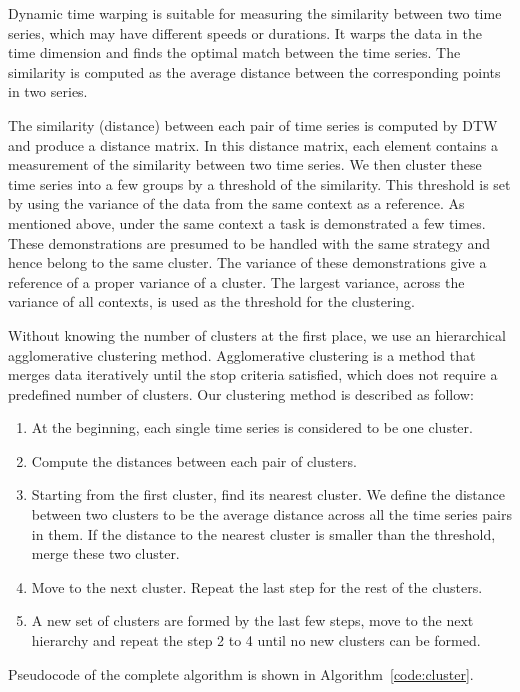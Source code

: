\documentclass[preprint,12pt]{elsarticle}
\begin{document}
Dynamic time warping is suitable for measuring the similarity between two time series, which may have different speeds or durations. It warps the data in the time dimension and finds the optimal match between the time series. The similarity is computed as the average distance between the corresponding points in two series.

The similarity (distance) between each pair of time series is computed by DTW and produce a distance matrix. In this distance matrix, each element contains a measurement of the similarity between two time series. We then cluster these time series into a few groups by a threshold of the similarity. This threshold is set by using the variance of the data from the same context as a reference. As mentioned above, under the same context a task is demonstrated a few times. These demonstrations are presumed to be handled with the same strategy and hence belong to the same cluster. The variance of these demonstrations give a reference of a proper variance of a cluster. The largest variance, across the variance of all contexts, is used as the threshold for the clustering.

Without knowing the number of clusters at the first place, we use an hierarchical agglomerative clustering method. Agglomerative clustering is a method that merges data iteratively until the stop criteria satisfied, which does not require a predefined number of clusters. Our clustering method is described as follow:

\begin{enumerate}
\item At the beginning, each single time series is considered to be one cluster.
\item Compute the distances between each pair of clusters.
\item Starting from the first cluster, find its nearest cluster. We define the distance between two clusters to be the average distance across all the time series pairs in them. If the distance to the nearest cluster is smaller than the threshold, merge these two cluster.
\item Move to the next cluster. Repeat the last step for the rest of the clusters.
\item A new set of clusters are formed by the last few steps, move to the next hierarchy and repeat the step 2 to 4 until no new clusters can be formed.
\end{enumerate}

Pseudocode of the complete algorithm is shown in Algorithm~\ref{code:cluster}.
\end{document}
